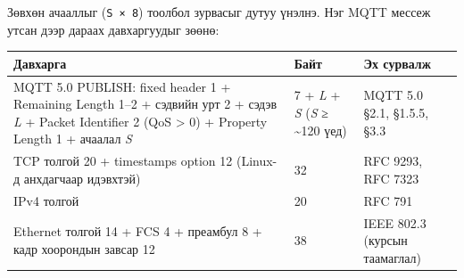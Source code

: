 Зөвхөн ачааллыг (\texttt{S\ ×\ 8}) тоолбол зурвасыг дутуу үнэлнэ. Нэг MQTT мессеж утсан дээр дараах давхаргуудыг зөөнө:

\begingroup\scriptsize\begin{longtable}[]{@{}lll@{}}
\toprule
\begin{minipage}[b]{0.30\columnwidth}\raggedright
Давхарга\strut
\end{minipage} & \begin{minipage}[b]{0.30\columnwidth}\raggedright
Байт\strut
\end{minipage} & \begin{minipage}[b]{0.30\columnwidth}\raggedright
Эх сурвалж\strut
\end{minipage}\tabularnewline
\midrule
\endhead
\begin{minipage}[t]{0.30\columnwidth}\raggedright
MQTT 5.0 PUBLISH: fixed header 1 + Remaining Length 1--2 + сэдвийн урт 2 + сэдэв \emph{L} + Packet Identifier 2 (QoS \textgreater{} 0) + Property Length 1 + ачаалал \emph{S}\strut
\end{minipage} & \begin{minipage}[t]{0.30\columnwidth}\raggedright
7 + \emph{L} + \emph{S} (\emph{S} ≥ \textasciitilde120 үед)\strut
\end{minipage} & \begin{minipage}[t]{0.30\columnwidth}\raggedright
MQTT 5.0 §2.1, §1.5.5, §3.3\strut
\end{minipage}\tabularnewline
\begin{minipage}[t]{0.30\columnwidth}\raggedright
TCP толгой 20 + timestamps option 12 (Linux-д анхдагчаар идэвхтэй)\strut
\end{minipage} & \begin{minipage}[t]{0.30\columnwidth}\raggedright
32\strut
\end{minipage} & \begin{minipage}[t]{0.30\columnwidth}\raggedright
RFC 9293, RFC 7323\strut
\end{minipage}\tabularnewline
\begin{minipage}[t]{0.30\columnwidth}\raggedright
IPv4 толгой\strut
\end{minipage} & \begin{minipage}[t]{0.30\columnwidth}\raggedright
20\strut
\end{minipage} & \begin{minipage}[t]{0.30\columnwidth}\raggedright
RFC 791\strut
\end{minipage}\tabularnewline
\begin{minipage}[t]{0.30\columnwidth}\raggedright
Ethernet толгой 14 + FCS 4 + преамбул 8 + кадр хоорондын завсар 12\strut
\end{minipage} & \begin{minipage}[t]{0.30\columnwidth}\raggedright
38\strut
\end{minipage} & \begin{minipage}[t]{0.30\columnwidth}\raggedright
IEEE 802.3 (курсын таамаглал)\strut
\end{minipage}\tabularnewline
\bottomrule
\end{longtable}\endgroup

